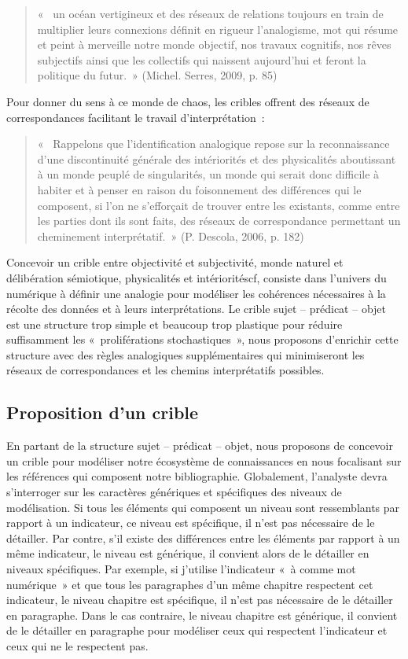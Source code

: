 \documentclass[
  a4paper,
  DIV=11,
  numbers=noendperiod]{scrreprt}
\begin{document}
\begin{quote}
«~ un océan vertigineux et des réseaux de relations toujours en train de
multiplier leurs connexions définit en rigueur l'analogisme, mot qui
résume et peint à merveille notre monde objectif, nos travaux cognitifs,
nos rêves subjectifs ainsi que les collectifs qui naissent aujourd'hui
et feront la politique du futur.~» (Michel. Serres, 2009, p. 85)
\end{quote}

Pour donner du sens à ce monde de chaos, les cribles offrent des réseaux
de correspondances facilitant le travail d'interprétation~:

\begin{quote}
«~ Rappelons que l'identification analogique repose sur la
reconnaissance d'une discontinuité générale des intériorités et des
physicalités aboutissant à un monde peuplé de singularités, un monde qui
serait donc difficile à habiter et à penser en raison du foisonnement
des différences qui le composent, si l'on ne s'efforçait de trouver
entre les existants, comme entre les parties dont ils sont faits, des
réseaux de correspondance permettant un cheminement interprétatif.~» (P.
Descola, 2006, p. 182)
\end{quote}

Concevoir un crible entre objectivité et subjectivité, monde naturel et
délibération sémiotique, physicalités et intérioritéscf, consiste dans
l'univers du numérique à définir une analogie pour modéliser les
cohérences nécessaires à la récolte des données et à leurs
interprétations. Le crible sujet -- prédicat -- objet est une structure
trop simple et beaucoup trop plastique pour réduire suffisamment les
«~proliférations stochastiques~», nous proposons d'enrichir cette
structure avec des règles analogiques supplémentaires qui minimiseront
les réseaux de correspondances et les chemins interprétatifs possibles.

\subsection{Proposition d'un crible}\label{sec-propositionCrible}

En partant de la structure sujet -- prédicat -- objet, nous proposons de
concevoir un crible pour modéliser notre écosystème de connaissances en
nous focalisant sur les références qui composent notre bibliographie.
Globalement, l'analyste devra s'interroger sur les caractères génériques
et spécifiques des niveaux de modélisation. Si tous les éléments qui
composent un niveau sont ressemblants par rapport à un indicateur, ce
niveau est spécifique, il n'est pas nécessaire de le détailler. Par
contre, s'il existe des différences entre les éléments par rapport à un
même indicateur, le niveau est générique, il convient alors de le
détailler en niveaux spécifiques. Par exemple, si j'utilise l'indicateur
«~à comme mot numérique~» et que tous les paragraphes d'un même chapitre
respectent cet indicateur, le niveau chapitre est spécifique, il n'est
pas nécessaire de le détailler en paragraphe. Dans le cas contraire, le
niveau chapitre est générique, il convient de le détailler en paragraphe
pour modéliser ceux qui respectent l'indicateur et ceux qui ne le
respectent pas.
\end{document}
